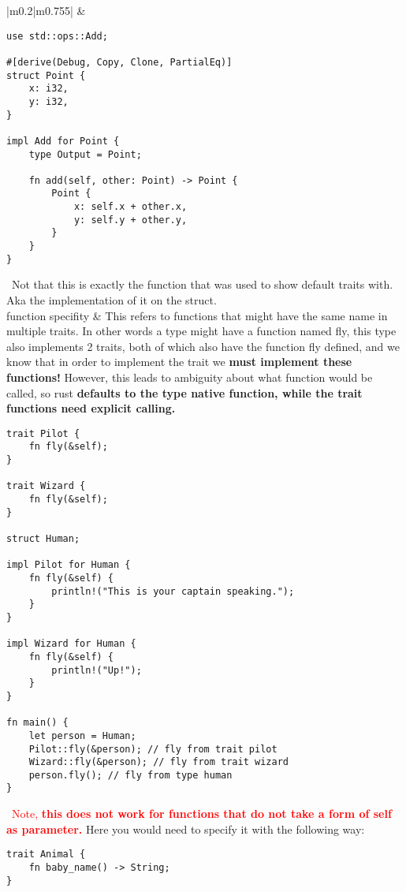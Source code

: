 \documentclass[main.tex,fontsize=8pt,paper=a4,paper=portrait,DIV=calc,]{scrartcl}
\begin{document}
\begin{table}[ht!]
\begin{tabular}{|m{0.2\linewidth}|m{0.755\linewidth}|}
\hline
&
\begin{lstlisting}
use std::ops::Add;

#[derive(Debug, Copy, Clone, PartialEq)]
struct Point {
    x: i32,
    y: i32,
}

impl Add for Point {
    type Output = Point;

    fn add(self, other: Point) -> Point {
        Point {
            x: self.x + other.x,
            y: self.y + other.y,
        }
    }
}
\end{lstlisting} 
\, \newline
\textcolor{OliveGreen}{Not that this is exactly the function that was used to show default traits with.\newline
Aka the implementation of it on the struct.}\\
\hline
function specifity & 
This refers to functions that might have the same name in multiple traits.\newline
In other words a type might have a function named fly, this type also implements 2 traits, both of which also have the function fly defined, and we know that in order to implement the trait we \textbf{must implement these functions!}\newline
However, this leads to ambiguity about what function would be called, so rust \textbf{defaults to the type native function, while the trait functions need explicit calling.}\newline
\begin{lstlisting}
trait Pilot {
    fn fly(&self);
}

trait Wizard {
    fn fly(&self);
}

struct Human;

impl Pilot for Human {
    fn fly(&self) {
        println!("This is your captain speaking.");
    }
}

impl Wizard for Human {
    fn fly(&self) {
        println!("Up!");
    }
}

fn main() {
    let person = Human;
    Pilot::fly(&person); // fly from trait pilot
    Wizard::fly(&person); // fly from trait wizard
    person.fly(); // fly from type human
}
\end{lstlisting} 
\, \newline
\textcolor{red}{Note, \textbf{this does not work for functions that do not take a form of self as parameter.}}\newline
Here you would need to specify it with the following way:\newline
\begin{lstlisting}
trait Animal {
    fn baby_name() -> String;
}


\end{lstlisting}
\end{tabular}
\end{table}
\end{document}
